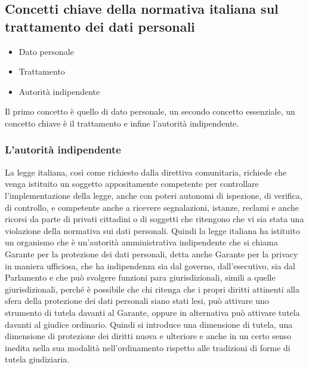 \subsection{Concetti chiave della normativa italiana sul trattamento dei dati personali}

\begin{itemize}
    \item Dato personale
    \item Trattamento
    \item Autorità indipendente
\end{itemize}

Il primo concetto è quello di dato personale, un secondo concetto essenziale, un concetto chiave è il trattamento e infine l'autorità indipendente. 

\subsubsection{L'autorità indipendente}

La legge italiana, così come richiesto dalla direttiva comunitaria, richiede che venga istituito un soggetto appositamente competente  per controllare l'implementazione della legge, anche con poteri autonomi di ispezione, di verifica, di controllo, e competente anche a ricevere segnalazioni, istanze, reclami e anche ricorsi da parte di privati cittadini o di soggetti che ritengono che vi sia stata una violazione della normativa sui dati personali. 
Quindi la legge italiana ha istituito un organismo che è un'autorità amministrativa indipendente che si chiama Garante per la protezione dei dati personali, detta anche Garante per la privacy in maniera ufficiosa, che ha indipendenza sia dal governo, dall'esecutivo, sia dal Parlamento e che può svolgere funzioni para giurisdizionali, simili a quelle giurisdizionali, perché è possibile che chi ritenga che i propri diritti attinenti alla sfera della protezione dei dati personali siano stati lesi, può attivare uno strumento di tutela davanti al Garante, oppure in alternativa può attivare tutela davanti al giudice ordinario. 
Quindi si introduce una dimensione di tutela, una dimensione di protezione dei diritti nuova e ulteriore e anche in un certo senso inedita nella sua modalità nell'ordinamento rispetto alle tradizioni di forme di tutela giudiziaria. 

